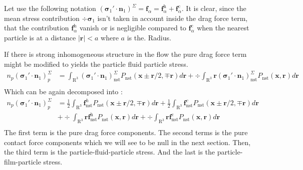 Let use the following notation $(\bm{\sigma}_1' \cdot \textbf{n}_1)^\Sigma = \textbf{f}_\alpha = \textbf{f}_\alpha^\text{h}+\textbf{f}_\alpha^\text{c}$. 
It is clear, since the mean stress contribution $\div \bm{\sigma}_1$ isn't taken in account inside the drag force term, that the contribution $\textbf{f}_\alpha^\text{h}$ vanish or is negligible compared to $\textbf{f}_\alpha^\text{c}$ when the nearest particle is at a distance $|\textbf{r}| < a$ where $a$ is the.  Radius. 

If there is strong inhomogeneous structure in the flow the pure drag force term might be modified to yields the particle fluid particle stress. 
\begin{align*}
    n_p (\bm{\sigma}_1' \cdot \textbf{n}_1)_p^\Sigma
    &= 
    \int_{\mathrm{R}^3} (\bm{\sigma}_1' \cdot \textbf{n}_1)_\text{nst}^\Sigma
    P_\text{nst}(\textbf{x}\pm\textbf{r}/2,\mp\textbf{r}) d\textbf{r}
    +\div \int_{\mathrm{R}^3} \textbf{r} (\bm{\sigma}_1' \cdot \textbf{n}_1)_\text{nst}^\Sigma
    P_\text{nst}(\textbf{x},\textbf{r}) d\textbf{r}\\
\end{align*}
Which can be again decomposed into : 
\begin{align*}
    n_p (\bm{\sigma}_1' \cdot \textbf{n}_1)_p^\Sigma
    &= 
    \frac{1}{2}\int_{\mathrm{R}^3} \textbf{f}^h_\text{nst}P_\text{nst}(\textbf{x}\pm\textbf{r}/2,\mp\textbf{r}) d\textbf{r}
    + \frac{1}{2}\int_{\mathrm{R}^3} \textbf{f}^c_\text{nst}P_\text{nst}(\textbf{x}\pm\textbf{r}/2,\mp\textbf{r}) d\textbf{r} \\
    &
    +\div \int_{\mathrm{R}^3} \textbf{r} \textbf{f}_\text{nst}^\text{h} P_\text{nst}(\textbf{x},\textbf{r}) d\textbf{r}
    +\div \int_{\mathrm{R}^3} \textbf{r} \textbf{f}_\text{nst}^\text{c} P_\text{nst}(\textbf{x},\textbf{r}) d\textbf{r}\\
\end{align*}
The first term is the pure drag force components. 
The second terms is the pure contact force components which we will see to be null in the next section. 
Then, the third term is the particle-fluid-particle stress. 
And the last is the particle-film-particle stress. 


